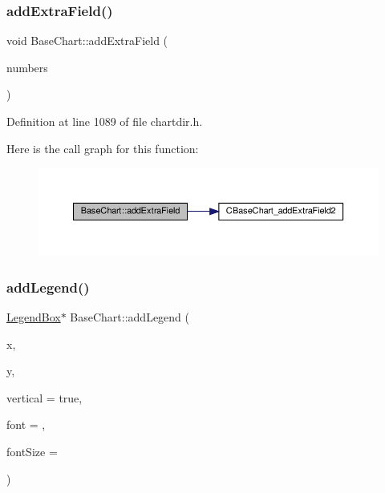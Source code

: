 \subsubsection{\texorpdfstring{add\+Extra\+Field()}{addExtraField()}\hspace{0.1cm}{\footnotesize\ttfamily [2/2]}}
{\footnotesize\ttfamily void Base\+Chart\+::add\+Extra\+Field (\begin{DoxyParamCaption}\item[{\hyperlink{class_double_array}{Double\+Array}}]{numbers }\end{DoxyParamCaption})\hspace{0.3cm}{\ttfamily [inline]}}



Definition at line 1089 of file chartdir.\+h.

Here is the call graph for this function\+:
\nopagebreak
\begin{figure}[H]
\begin{center}
\leavevmode
\includegraphics[width=350pt]{class_base_chart_a485ce8c856c9d27abf934103ad5db4ee_cgraph}
\end{center}
\end{figure}
\mbox{\label{class_base_chart_ad204c676b75a5e1527dcd01066c1aab4}} 
\subsubsection{\texorpdfstring{add\+Legend()}{addLegend()}}
{\footnotesize\ttfamily \hyperlink{class_legend_box}{Legend\+Box}$\ast$ Base\+Chart\+::add\+Legend (\begin{DoxyParamCaption}\item[{int}]{x,  }\item[{int}]{y,  }\item[{bool}]{vertical = {\ttfamily true},  }\item[{const char $\ast$}]{font = {},  }\item[{double}]{font\+Size = {} }\end{DoxyParamCaption})\hspace{0.3cm}{\ttfamily [inline]}}



